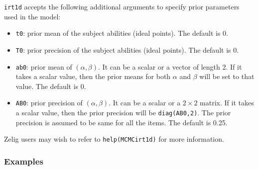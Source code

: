 \noindent \texttt{irt1d} accepts the following additional arguments to 
specify prior parameters used in the model:

\begin{itemize}

\item \texttt{t0}: prior mean of the subject abilities
(ideal points). The default is 0.

\item \texttt{T0}: prior precision of the subject abilities
(ideal points). The default is 0.

\item \texttt{ab0}: prior mean of $(\alpha, \beta)$. It can be a scalar or
a vector of length 2. If it takes a scalar value, then the prior means for
both $\alpha$ and $\beta$ will be set to that value. The default is 0. 

\item \texttt{AB0}: prior precision of $(\alpha, \beta)$. It can be 
a scalar or a $2 \times 2$ matrix. If it takes a scalar value, 
then the prior precision will be \texttt{diag(AB0,2)}. The prior precision
is assumed to be same for all the items. The default is 0.25.

\end{itemize}

Zelig users may wish to refer to \texttt{help(MCMCirt1d)} for more 
information.



\subsubsection{Examples}

